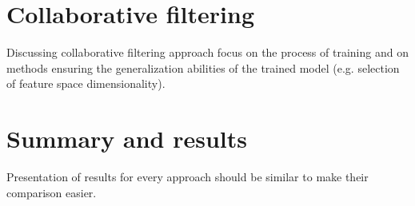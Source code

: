 \documentclass{article}
\begin{document}
\newpage
\section{Collaborative filtering}
Discussing collaborative filtering approach focus on the process of training and on methods ensuring the generalization abilities of the trained model (e.g. selection of feature space dimensionality).


\newpage
\section{Summary and results}
Presentation of results for every approach should be similar to make their comparison easier.
\end{document}
